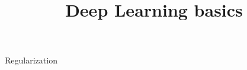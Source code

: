 



\newcommand{\learninggoals}{
\item Understand the concept of regularization
\item Understand L2 regularization in more detail}

\title{Deep Learning basics}
\date{}




\begin{vbframe}{Regularization}

\vfill


\end{vbframe}
